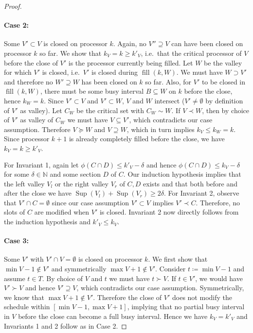 \documentclass[a4paper]{article}
\DeclareMathOperator{\fillop}{fill}
\DeclareMathOperator{\res}{Sup}
\begin{document}
\begin{proof}
  \paragraph{Case 2:}\label{case:2}
      Some $V' \subset V$ is closed on processor $k$.
      Again, no $V'' \supseteq V$ can have been closed on processor $k$ so far.
      We show that $k_V = k \geq k'_V$, i.e.\ that the critical processor of $V$ before the close of $V'$ is the processor currently being filled.
      Let $W$ be the valley for which $V'$ is closed, i.e.\ $V'$ is closed during $\fillop(k, W)$.
      We must have $W \supset V'$ and therefore no $W' \supseteq W$ has been closed on $k$ so far.
      Also, for $V'$ to be closed in $\fillop(k, W)$, there must be some busy interval $B \subseteq W$ on $k$ before the close, hence $k_W = k$.
      Since $V' \subset V$ and $V' \subset W$, $V$ and $W$ intersect ($V' \neq \emptyset$ by definition of $V'$ as valley).
      Let $C_W$ be the critical set with $C_W \sim W$.
      If $V \prec W$, then by choice of $V'$ as valley of $C_W$ we must have $V \subseteq V'$, which contradicts our case assumption.
      Therefore $V \succeq W$ and $V \supseteq W$, which in turn implies $k_V \leq k_W = k$.
      Since processor $k+1$ is already completely filled before the close, we have $k_V = k \geq k'_V$.

      For Invariant 1, again let $\phi(C \cap D) \leq k'_V - \delta$ and hence $\phi(C \cap D) \leq k_V - \delta$ for some $\delta \in \mathbb{N}$ and some section $D$ of $C$.
      Our induction hypothesis implies that the left valley $V_l$ or the right valley $V_r$ of $C, D$ exists and that both before and after the close we have $\res(V_l) + \res(V_r) \geq 2 \delta$.
      For Invariant 2, observe that $V' \cap C = \emptyset$ since our case assumption $V' \subset V$ implies $V' \prec C$.
      Therefore, no slots of $C$ are modified when $V'$ is closed.
      Invariant 2 now directly follows from the induction hypothesis and $k'_V \leq k_V$.


  \paragraph{Case 3:}
      Some $V'$ with $V' \cap V = \emptyset$ is closed on processor $k$.
      We first show that $\min V - 1 \notin V'$ and symmetrically $\max V + 1 \notin V'$.
      Consider $t \coloneqq \min V - 1$ and assume $t \in T$.
      By choice of $V$ and $t$ we must have $t \succ V$.
      If $t \in V'$, we would have $V' \succ V$ and hence $V' \supseteq V$, which contradicts our case assumption.
      Symmetrically, we know that $\max V + 1 \notin V'$.
      Therefore the close of $V'$ does not modify the schedule within $[\min V - 1, \max V + 1]$, implying that no partial busy interval in $V$ before the close can become a full busy interval.
      Hence we have $k_V = k'_V$ and Invariants 1 and 2 follow as in Case 2.


\end{proof}
\end{document}
